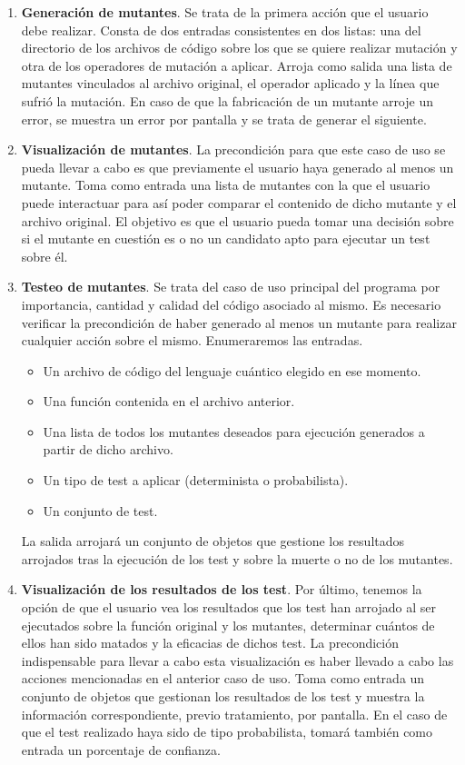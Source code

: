 \begin{enumerate}
\item \textbf{Generación de mutantes}. Se trata de la primera acción que el usuario debe realizar. Consta de dos entradas consistentes en dos listas: una del directorio de los archivos de código sobre los que se quiere realizar mutación y otra de los operadores de mutación a aplicar. Arroja como salida una lista de mutantes vinculados al archivo original, el operador aplicado y la línea que sufrió la mutación. En caso de que la fabricación de un mutante arroje un error, se muestra un error por pantalla y se trata de generar el siguiente.

\item \textbf{Visualización de mutantes}. La precondición para que este caso de uso se pueda llevar a cabo es que previamente el usuario haya generado al menos un mutante. Toma como entrada una lista de mutantes con la que el usuario puede interactuar para así poder comparar el contenido de dicho mutante y el archivo original. El objetivo es que el usuario pueda tomar una decisión sobre si el mutante en cuestión es o no un candidato apto para ejecutar un test sobre él.

\item \textbf{Testeo de mutantes}. Se trata del caso de uso principal del programa por importancia, cantidad y calidad del código asociado al mismo. Es necesario verificar la precondición de haber generado al menos un mutante para realizar cualquier acción sobre el mismo. Enumeraremos las entradas.
	\begin{itemize}
	\item Un archivo de código del lenguaje cuántico elegido en ese momento.
	\item Una función contenida en el archivo anterior.
	\item Una lista de todos los mutantes deseados para ejecución generados a partir de dicho archivo.
	\item Un tipo de test a aplicar (determinista o probabilista).
	\item Un conjunto de test.
	\end{itemize}
	
La salida arrojará un conjunto de objetos que gestione los resultados arrojados tras la ejecución de los test y sobre la muerte o no de los mutantes.

\item \textbf{Visualización de los resultados de los test}. Por último, tenemos la opción de que el usuario vea los resultados que los test han arrojado al ser ejecutados sobre la función original y los mutantes, determinar cuántos de ellos han sido matados y la eficacias de dichos test. La precondición indispensable para llevar a cabo esta visualización es haber llevado a cabo las acciones mencionadas en el anterior caso de uso. Toma como entrada un conjunto de objetos que gestionan los resultados de los test y muestra la información correspondiente, previo tratamiento, por pantalla. En el caso de que el test realizado haya sido de tipo probabilista, tomará también como entrada un porcentaje de confianza.
\end{enumerate}

